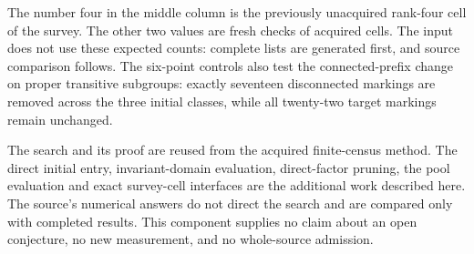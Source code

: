 \documentclass[11pt,a4paper]{article}
\begin{document}
The number four in the middle column is the previously unacquired rank-four
cell of the survey. The other two values are fresh checks of acquired cells.
The input does not use these expected counts: complete lists are generated
first, and source comparison follows. The six-point controls also test the
connected-prefix change on proper transitive subgroups: exactly seventeen
disconnected markings are removed across the three initial classes, while
all twenty-two target markings remain unchanged.

The search and its proof are reused from the acquired finite-census
method. The direct initial entry, invariant-domain evaluation, direct-factor
pruning, the pool evaluation and exact survey-cell interfaces are the additional work
described here. The source's numerical answers do
not direct the search and are compared only with completed results.
This component supplies no claim about an open conjecture, no new
measurement, and no whole-source admission.
\end{document}
